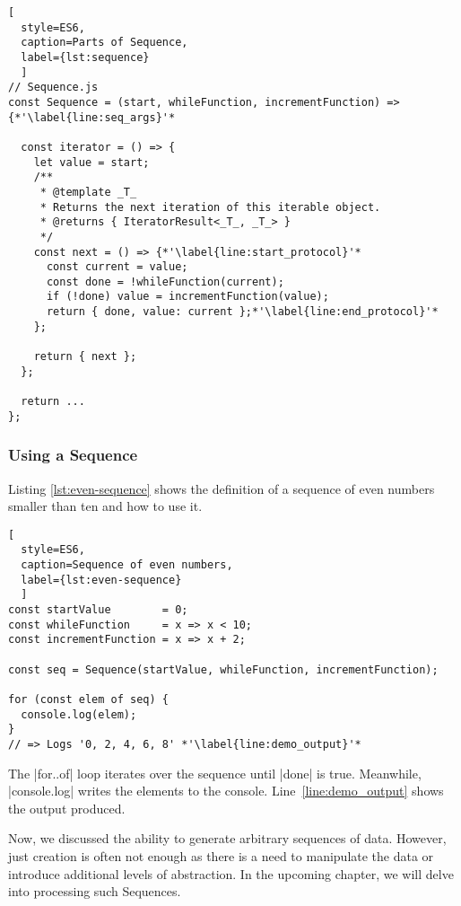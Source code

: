 \begin{lstlisting}[
  style=ES6, 
  caption=Parts of Sequence,
  label={lst:sequence}
  ]
// Sequence.js
const Sequence = (start, whileFunction, incrementFunction) => {*'\label{line:seq_args}'*

  const iterator = () => {
    let value = start;
    /**
     * @template _T_
     * Returns the next iteration of this iterable object.
     * @returns { IteratorResult<_T_, _T_> }
     */
    const next = () => {*'\label{line:start_protocol}'*
      const current = value;
      const done = !whileFunction(current);
      if (!done) value = incrementFunction(value);
      return { done, value: current };*'\label{line:end_protocol}'*
    };

    return { next };
  };

  return ... 
};
\end{lstlisting}


\subsubsection{Using a Sequence}
\label{subsub:Using a Sequence}
Listing \ref{lst:even-sequence} shows the definition of a sequence of even 
numbers smaller than ten and how to use it. 
\begin{lstlisting}[
  style=ES6, 
  caption=Sequence of even numbers,
  label={lst:even-sequence}
  ]
const startValue        = 0;
const whileFunction     = x => x < 10;
const incrementFunction = x => x + 2;

const seq = Sequence(startValue, whileFunction, incrementFunction);

for (const elem of seq) {
  console.log(elem);
}
// => Logs '0, 2, 4, 6, 8' *'\label{line:demo_output}'*
\end{lstlisting}

The |for..of| loop iterates over the sequence until |done| is true. Meanwhile,
|console.log| writes the elements to the console.
Line~\ref{line:demo_output} shows the output produced.

Now, we discussed the ability to generate arbitrary sequences of data. However, 
just creation is often not enough as there is a need to manipulate the data or 
introduce additional levels of abstraction. In the upcoming chapter, we will 
delve into processing such Sequences.
